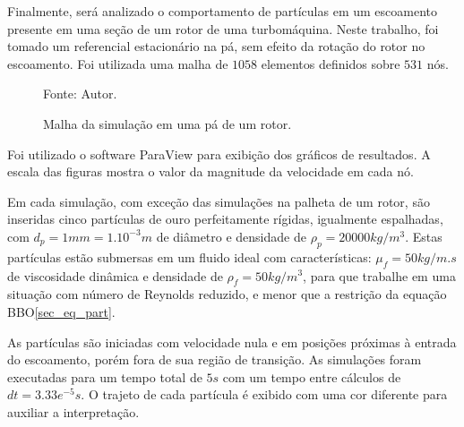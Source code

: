 \begin{itemize}
        Finalmente, será analizado o comportamento de partículas em um escoamento presente em uma seção de um rotor de uma turbomáquina.
        Neste trabalho, foi tomado um referencial estacionário na pá, sem efeito da rotação do rotor no escoamento.
        Foi utilizada uma malha de $1058$ elementos definidos sobre $531$ nós.
        \begin{figure}[H]
            \centering
             {\raggedleft \scriptsize Fonte: Autor.}
            \caption{Malha da simulação em uma pá de um rotor.}
            \label{rotor_mesh}
        \end{figure}
\end{itemize}

Foi utilizado o software ParaView para exibição dos gráficos de resultados.
A escala das figuras mostra o valor da magnitude da velocidade em cada nó.

Em cada simulação, com exceção das simulações na palheta de um rotor, são inseridas cinco partículas de ouro perfeitamente rígidas, igualmente espalhadas, com $d_p=1mm=1.10^{-3}m$ de diâmetro e densidade de $\rho_p=20000kg/m^3$.
Estas partículas estão submersas em um fluido ideal com características: $\mu_f=50kg/m.s$ de viscosidade dinâmica e densidade de $\rho_f=50kg/m^3$, para que trabalhe em uma situação com número de Reynolds reduzido, e menor que a restrição da equação BBO\ref{sec_eq_part}.

As partículas são iniciadas com velocidade nula e em posições próximas à entrada do escoamento, porém fora de sua região de transição.
As simulações foram executadas para um tempo total de $5s$ com um tempo entre cálculos de $dt=3.33e^{-5}s$.
O trajeto de cada partícula é exibido com uma cor diferente para auxiliar a interpretação. 

